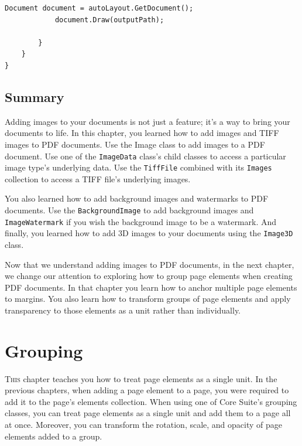 \documentclass[american]{tufte-book}
\numberwithin{equation}{section}
\numberwithin{figure}{section}
\def\color#1{}%
\begin{document}
{\begin{lstlisting}[caption={Using AutoLayout to create a PDF document.},label={lis:autolayout-images},basicstyle={\footnotesize\ttfamily},breaklines=true]
            Document document = autoLayout.GetDocument();
            document.Draw(outputPath);

        }
    }
}
\end{lstlisting}
\leavevmode\egroup

\section{Summary}

Adding images to your documents is not just a feature; it's a way
to bring your documents to life. In this chapter, you learned how
to add images and TIFF images to PDF documents. Use the Image class
to add images to a PDF document. Use one of the \texttt{ImageData}
class's child classes to access a particular image type's underlying
data. Use the \texttt{TiffFile} combined with its \texttt{Images}
collection to access a TIFF file's underlying images. 

You also learned how to add background images and watermarks to PDF
documents. Use the \texttt{BackgroundImage} to add background images
and \texttt{ImageWatermark} if you wish the background image to be
a watermark. And finally, you learned how to add 3D images to your
documents using the \texttt{Image3D} class. 

Now that we understand adding images to PDF documents, in the next
chapter, we change our attention to exploring how to group page elements
when creating PDF documents. In that chapter you learn how to anchor
multiple page elements to margins. You also learn how to transform
groups of page elements and apply transparency to those elements as
a unit rather than individually.

\color{white}
\chapter{Grouping}\label{chap:Page-Elements--grouping}
\color{black}
\BgThispage
\vspace{8.00em}
\lettrine[lines=2,lhang=0.1]{T}{his} chapter teaches you how to treat page elements as a single unit.
In the previous chapters, when adding a page element to a page, you
were required to add it to the page's elements collection. When using
one of Core Suite's grouping classes, you can treat page elements
as a single unit and add them to a page all at once. Moreover, you
can transform the rotation, scale, and opacity of page elements added
to a group. 

}
\end{document}
